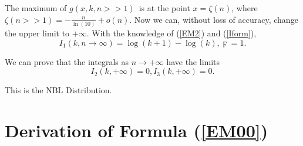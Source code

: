 \documentclass[titlepage,fleqn]{article}%
\begin{document}
%


\bigskip

The maximum of $g(x,k,n>>1)$\ is at the point $x=\zeta(n)$, where
$\zeta(n>>1)=-\frac{n}{\ln(10)}+o(n)$. Now we can, without loss of accuracy,
change the upper limit to $+\infty.$ With the knowledge of (\ref{EM2}) and
(\ref{Iform}),%
\begin{equation}
I_{1}(k,n\rightarrow\infty)=\log(k+1)-\log(k),\digamma=1. \label{Prof1}%
\end{equation}


We can prove that the integrals as $n\rightarrow+\infty$ have the limits%
\[
I_{2}(k,+\infty)=0,I_{3}(k,+\infty)=0.
\]


This is the NBL Distribution.

\section{Derivation of Formula (\ref{EM00})}

\bigskip%
\label{DerForm}%
\end{document}
